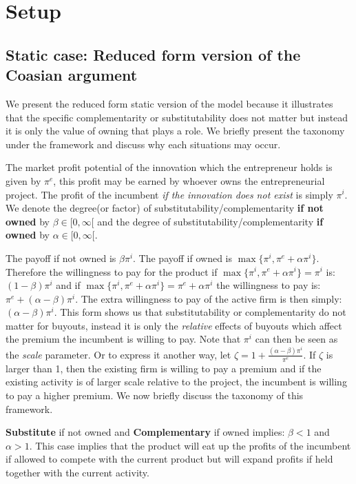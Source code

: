 \documentclass[11pt]{article}
\begin{document}
\section{Setup}\label{setup}

\subsection{Static case: Reduced form version of the Coasian argument}\label{static}

We present the reduced form static version of the model because it illustrates that the specific complementarity or substitutability does not matter but instead it is only the  value of owning that plays a role.  We briefly present the taxonomy under the framework and discuss why each situations may occur. 

The market profit potential of the innovation which the entrepreneur holds is given by $\pi^e$, this profit may be earned by whoever owns the entrepreneurial project. The profit of the incumbent \textit{if the innovation does not exist} is simply $\pi^i$. We denote the degree(or factor) of substitutability/complementarity \textbf{if not owned} by $\beta \in [ 0, \infty [$ and the degree of substitutability/complementarity  \textbf{if owned} by $\alpha \in [0, \infty [ $. 

The payoff if not owned is $ \beta \pi^i$. The payoff if owned is $\max\{ \pi^i, \pi^e + \alpha \pi^i   \}$. Therefore the willingness to pay for the product if  $\max\{ \pi^i, \pi^e + \alpha \pi^i   \} = \pi^i $ is: $(1-\beta) \pi^i$ and if $\max\{ \pi^i, \pi^e + \alpha \pi^i   \} = \pi^e + \alpha \pi^i $ the willingness to pay is: $\pi^e+ (\alpha-\beta) \pi^i$. The extra willingness to pay of the active firm is then simply: $(\alpha-\beta)\pi^i$. This form shows us that substitutability or complementarity do not matter for buyouts, instead it is only the \textit{relative} effects of buyouts which affect the premium the incumbent is willing to pay. Note that $\pi^i$ can then be seen as the \textit{scale} parameter. Or to express it another way, let $\zeta=1 + \frac{(\alpha-\beta)\pi^i}{\pi^e}$. If $\zeta$ is larger than 1, then the existing firm is willing to pay a premium and if the existing activity is of larger scale relative to the project, the incumbent is willing to pay a higher premium. We now briefly discuss the taxonomy of this framework. 

\textbf{Substitute}  if not owned and \textbf{Complementary} if owned implies: $\beta<1$ and $\alpha>1$. This case implies that the product will eat up the profits of the incumbent if allowed to compete with the current product but will expand profits if held together with the current activity. 
\end{document}
